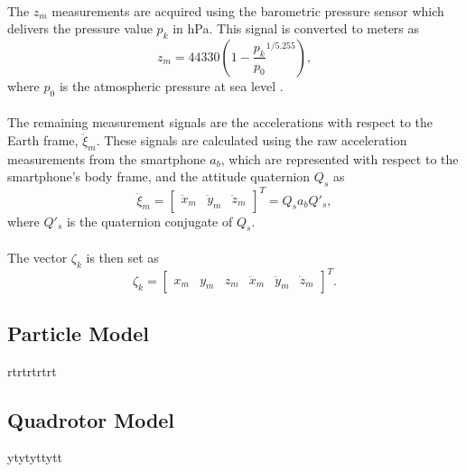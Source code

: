 \\
The $z_{m}$ measurements are acquired using the barometric pressure sensor which delivers the pressure value $p_k$ in hPa. This signal is converted to meters as
\begin{equation}\label{eqn:hbarom}
z_{m} = 44330\left(1-\frac{p_k}{p_{0}}^{1/5.255}\right),
\end{equation}
where $p_{0}$ is the atmospheric pressure at sea level \cite{Lauszus2015}.\\\\
The remaining measurement signals are the accelerations with respect to the Earth frame, $\ddot{\xi}_{m}$. These signals are calculated using the raw acceleration measurements from the smartphone $a_{b}$, which are represented with respect to the smartphone's body frame, and the attitude quaternion $Q_s$ as
\begin{equation}
\ddot{\xi}_{m} = \begin{bmatrix}
\ddot{x}_{m} & \ddot{y}_{m} & \ddot{z}_{m}
\end{bmatrix}^{T} =Q_{s}a_{b}Q'_{s},
\end{equation}
where $Q'_{s}$ is the quaternion conjugate of $Q_{s}$.
\\\\
The vector $\zeta_k$ is then set as
\begin{equation}
\zeta_k = \begin{bmatrix}
x_{m} & y_{m} & z_{m} & \ddot{x}_{m} & \ddot{y}_{m} & \ddot{z}_{m}
\end{bmatrix}^{T}.
\end{equation}

\subsection{Particle Model}
rtrtrtrtrt

\subsection{Quadrotor Model}
ytytyttytt

